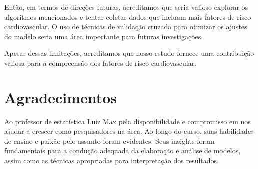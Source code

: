 \documentclass[article,11pt,a4paper,brazil]{abntex2}
\begin{document}
	Então, em termos de direções futuras, acreditamos que seria valioso explorar os algoritmos mencionados e tentar coletar dados que incluam mais fatores de risco cardiovascular. O uso de técnicas de validação cruzada para otimizar os ajustes do modelo seria uma área importante para futuras investigações.
	 
	 Apesar dessas limitações, acreditamos que nosso estudo fornece uma contribuição valiosa para a compreensão dos fatores de risco cardiovascular. 
	

	
	\section*{Agradecimentos}
	Ao professor de estatística Luiz Max pela disponibilidade e compromisso em nos ajudar a crescer como pesquisadores na área. Ao longo do curso, suas habilidades de ensino e paixão pelo assunto foram evidentes. Seus insights foram fundamentais para a condução adequada da elaboração e análise de modelos, assim como as técnicas apropriadas para interpretação dos resultados.
	
	\newpage
	
	

	
\end{document}
